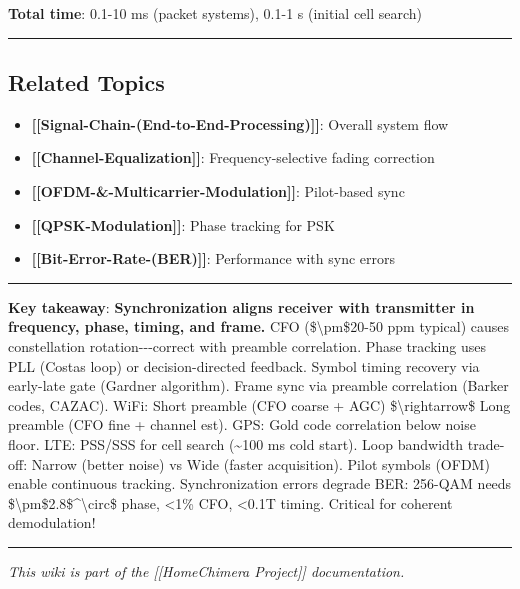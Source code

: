 \textbf{Total time}: 0.1-10 ms (packet systems), 0.1-1 s (initial cell
search)

\begin{center}\rule{0.5\linewidth}{0.5pt}\end{center}

\subsection{Related Topics}\label{related-topics}

\begin{itemize}
\tightlist
\item
  \textbf{{[}{[}Signal-Chain-(End-to-End-Processing){]}{]}}: Overall
  system flow
\item
  \textbf{{[}{[}Channel-Equalization{]}{]}}: Frequency-selective fading
  correction
\item
  \textbf{{[}{[}OFDM-\&-Multicarrier-Modulation{]}{]}}: Pilot-based sync
\item
  \textbf{{[}{[}QPSK-Modulation{]}{]}}: Phase tracking for PSK
\item
  \textbf{{[}{[}Bit-Error-Rate-(BER){]}{]}}: Performance with sync
  errors
\end{itemize}

\begin{center}\rule{0.5\linewidth}{0.5pt}\end{center}

\textbf{Key takeaway}: \textbf{Synchronization aligns receiver with
transmitter in frequency, phase, timing, and frame.} CFO
(\$\textbackslash pm\$20-50 ppm typical) causes constellation
rotation-\/-\/-correct with preamble correlation. Phase tracking uses
PLL (Costas loop) or decision-directed feedback. Symbol timing recovery
via early-late gate (Gardner algorithm). Frame sync via preamble
correlation (Barker codes, CAZAC). WiFi: Short preamble (CFO coarse +
AGC) \$\textbackslash rightarrow\$ Long preamble (CFO fine + channel
est). GPS: Gold code correlation below noise floor. LTE: PSS/SSS for
cell search (\textasciitilde100 ms cold start). Loop bandwidth
trade-off: Narrow (better noise) vs Wide (faster acquisition). Pilot
symbols (OFDM) enable continuous tracking. Synchronization errors
degrade BER: 256-QAM needs
\$\textbackslash pm\$2.8\$\^{}\textbackslash circ\$ phase, \textless1\%
CFO, \textless0.1T timing. Critical for coherent demodulation!

\begin{center}\rule{0.5\linewidth}{0.5pt}\end{center}

\emph{This wiki is part of the {[}{[}Home\textbar Chimera Project{]}{]}
documentation.}
